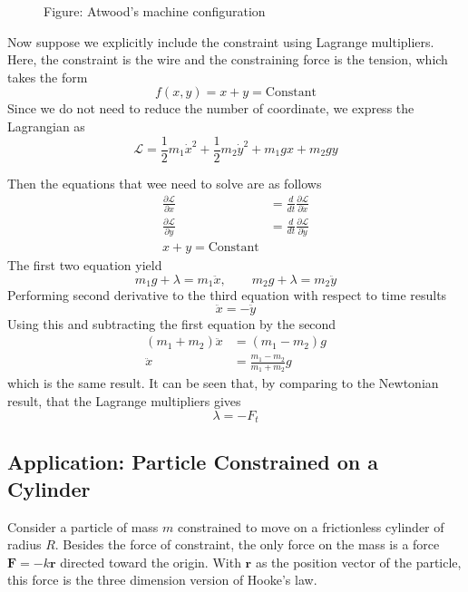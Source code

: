 \documentclass[../../../main.tex]{subfiles}
\begin{document}
\begin{figure*}
	\centering
	\caption*{Figure: Atwood's machine configuration}
\end{figure*}

Now suppose we explicitly include the constraint using Lagrange multipliers.
Here, the constraint is the wire and the constraining force is the tension, which takes the form 
\begin{equation*}
    f(x,y)=x+y=\text{Constant}
\end{equation*}
Since we do not need to reduce the number of coordinate, we express the Lagrangian as 
\begin{equation*}
    \mathcal{L}=\frac{1}{2}m_1\dot{x}^2+\frac{1}{2}m_2\dot{y}^2+m_1gx+m_2gy
\end{equation*}

Then the equations that wee need to solve are as follows
\begin{align*}
    \frac{\partial \mathcal{L}}{\partial x}&=\frac{d}{dt}\frac{\partial\mathcal{L}}{\partial\dot{x}}\\
    \frac{\partial \mathcal{L}}{\partial y}&=\frac{d}{dt}\frac{\partial\mathcal{L}}{\partial\dot{y}}\\
    x+y=\text{Constant}
\end{align*}
The first two equation yield
\begin{equation*}
    m_1g+\lambda=m_1\ddot{x},\qquad m_2g+\lambda=m_2\ddot{y}
\end{equation*}
Performing second derivative to the third equation with respect to time results
\begin{equation*}
    \ddot{x}=-\ddot{y}
\end{equation*}
Using this and subtracting the first equation by the second 
\begin{align*}
    (m_1+m_2)\ddot{x}&=(m_1-m_2)g\\
    \ddot{x}&=\frac{m_1-m_2}{m_1+m_2}g
\end{align*}
which is the same result. 
It can be seen that, by comparing to the Newtonian result, that the Lagrange multipliers gives
\begin{equation*}
    \lambda=-F_t
\end{equation*} 

\subsection*{Application: Particle Constrained on a Cylinder}
Consider a particle of mass $m$ constrained to move on a frictionless cylinder of radius $R$.
Besides the force of constraint, the only force on the mass is a force $\mathbf{F}= -k\mathbf{r}$ directed toward the origin.
With $\mathbf{r}$ as the position vector of the particle, this force is the three dimension version of Hooke's law.
\end{document}
